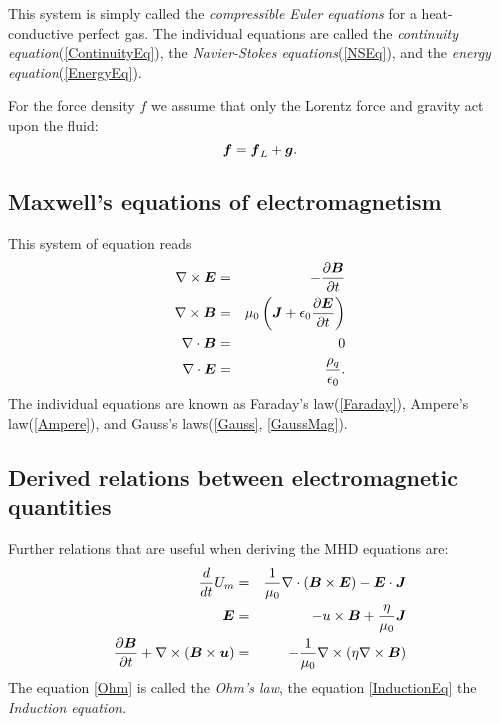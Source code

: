This system is simply called the \textit{compressible Euler equations} for a heat-conductive perfect gas. The individual equations are called the \textit{continuity equation}(\ref{ContinuityEq}), the \textit{Navier-Stokes equations}(\ref{NSEq}), and the \textit{energy equation}(\ref{EnergyEq}).

For the force density $f$ we assume that only the Lorentz force and gravity act upon the fluid:
$$
\label{ForceEq} \mbox{\boldmath $f$} = \mbox{\boldmath $f$}_L + \mbox{\boldmath $g$}.
$$


\subsection{Maxwell's equations of electromagnetism}
This system of equation reads
\begin{eqnarray}
\label{Faraday} \nabla \times \mbox{\boldmath $E$} & = & -\frac{\partial{\mbox{\boldmath $B$}}}{\partial{t}}\\
\label{Ampere} \nabla \times \mbox{\boldmath $B$} & = & \mu_0 \left( \mbox{\boldmath $J$} + \epsilon_0 \frac{\partial{\mbox{\boldmath $E$}}}{\partial{t}}\right)\\\
\label{GaussMag} \nabla \cdot \mbox{\boldmath $B$} & = &0\\
\label{Gauss} \nabla \cdot \mbox{\boldmath $E$} & = & \frac{\rho_q}{\epsilon_0}.
\end{eqnarray}
The individual equations are known as Faraday's law(\ref{Faraday}), Ampere's law(\ref{Ampere}), and Gauss's laws(\ref{Gauss}, \ref{GaussMag}).


\subsection{Derived relations between electromagnetic quantities}
Further relations that are useful when deriving the MHD equations are:
\begin{eqnarray}
\label{U_mEq} \frac{d}{dt} U_m & = & \frac{1}{\mu_0}\nabla \cdot \left( \mbox{\boldmath $B$}\times\mbox{\boldmath $E$}\right) - \mbox{\boldmath $E$}\cdot\mbox{\boldmath $J$}\\
\label{Ohm} \mbox{\boldmath $E$} & = & -u \times \mbox{\boldmath $B$} + \frac{\eta}{\mu_0}\mbox{\boldmath $J$}\\
\label{InductionEq} \frac{\partial{\mbox{\boldmath $B$}}}{\partial{t}} + \nabla \times \left( \mbox{\boldmath $B$} \times \mbox{\boldmath $u$} \right) & = & -\frac{1}{\mu_0} \nabla \times \left( \eta \nabla \times \mbox{\boldmath $B$} \right)
\end{eqnarray}
The equation \ref{Ohm} is called the \textit{Ohm's law}, the equation \ref{InductionEq} the \textit{Induction equation}.


